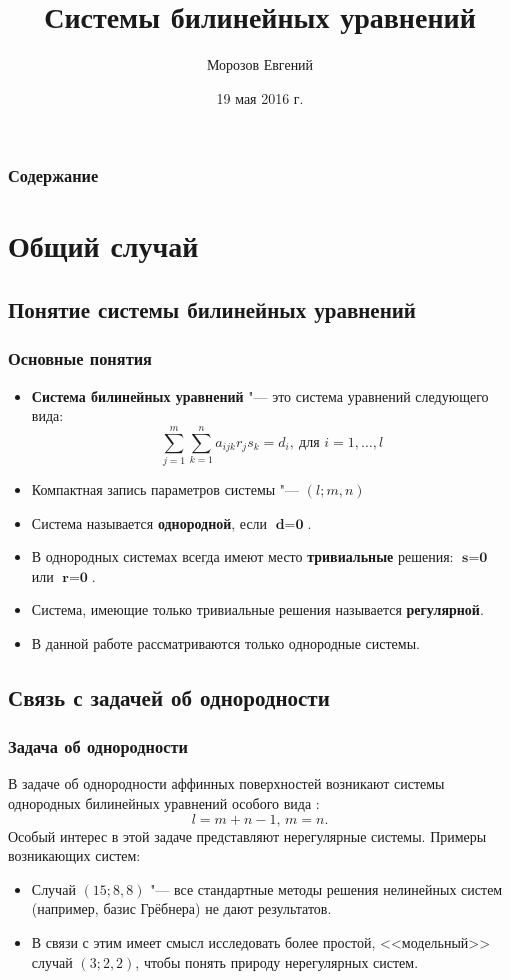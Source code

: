 \documentclass{beamer}
\title{Системы билинейных уравнений}
\institute
{
	Воронежский Государственный Университет \\
	Факультет Компьютерных Наук
}
\author{Морозов Евгений}
\date{19 мая 2016 г.}
\begin{document}
\frame{\titlepage}

\section[Outline]{}
\frame
{
	\frametitle{Содержание}
	\tableofcontents
}

\section{Общий случай}
\subsection{Понятие системы билинейных уравнений}
\frame
{
  \frametitle{Основные понятия}
  
	\begin{itemize}
		\item \textbf{Система билинейных уравнений} "--- это система уравнений следующего вида:
		$$
			\sum_{j = 1}^{m} \sum_{k = 1}^{n} a_{i j k} r_j s_k = d_i,~\text{для } i = 
			1,\dots,l
		$$
		\item Компактная запись параметров системы "--- $(l; m, n)$
		\item Система называется \textbf{однородной}, если $\textbf{d} = \textbf{0}$. 
	 	\item В однородных 	системах всегда имеют место \textbf{тривиальные} решения: $\textbf{s} =  
			  \textbf{0}$ или $\textbf{r} = \textbf{0}$.
		\item Система, имеющие только тривиальные решения называется \textbf{регулярной}.
		\item В данной работе рассматриваются только однородные системы.
	\end{itemize}
}
\subsection{Связь с задачей об однородности}
\frame
{
	\frametitle{Задача об однородности}
	
	В задаче об однородности аффинных поверхностей возникают 
	системы однородных билинейных уравнений особого вида : 
	$$l = m + n - 1,\, m = n.$$ 
	Особый интерес в этой задаче представляют нерегулярные системы.
	Примеры возникающих систем:
	\begin{itemize}
		\item Случай $(15; 8, 8)$ "--- все стандартные методы решения нелинейных систем 
		(например, базис Грёбнера) не дают результатов. 
		\item В связи с этим имеет смысл исследовать более простой, <<модельный>> случай 
		$(3;2,2)$, чтобы понять природу нерегулярных систем.
	\end{itemize}
}
\end{document}
